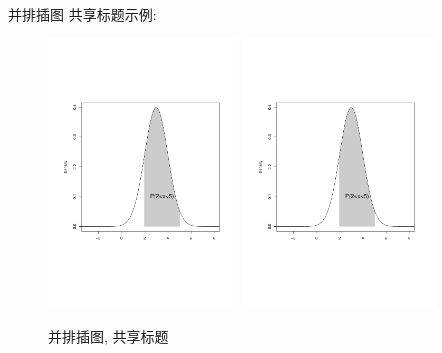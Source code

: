 \documentclass{cosbook}
\begin{document}
并排插图 共享标题示例:
\begin{figure}[htbp]
\centering
\includegraphics[width=0.45\textwidth]{figure.pdf}
\includegraphics[width=0.45\textwidth]{figure.pdf}
\caption{并排插图, 共享标题}
\end{figure}
\end{document}
